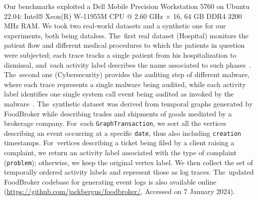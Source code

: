 \documentclass[information,article,accept,pdftex,oneauthor]{Definitions/mdpi}
\begin{document}
Our benchmarks exploited a Dell Mobile Precision Workstation 5760 on Ubuntu 22.04: Intel® Xeon(R) W-11955M CPU @ 2.60 GHz $\times$ 16, 64 GB DDR4 3200 MHz RAM. We took two real-world datasets and a synthetic one for our experiments, both being dataless. The~first real dataset ({Hospital}) monitors the patient flow and different medical procedures to which the patients in question were subjected; each trace tracks a single patient from his hospitalization to dismissal, and~each activity label describes the name associated to such phases~\cite{https://doi.org/10.4121/uuid:d9769f3d-0ab0-4fb8-803b-0d1120ffcf54}. The~second one ({Cybersecurity}) provides the auditing step of different malware, where each trace represents  a single malware being audited, while each activity label identifies one single system call event being audited as invoked by the malware~\cite{10.7717/peerj-cs.346,DBLP:conf/siu/YaziCG19}.  The~synthetic dataset was derived from temporal graphs generated by {FoodBroker} \cite{DBLP:conf/wbdb/PetermannJMR14} while describing trades and shipments of goods  mediated by a brokerage company. For~each \texttt{GraphTransaction}, we sort all the vertices describing an event occurring at a specific \texttt{date}, thus also including  \texttt{creation} timestamps. For~vertices describing a ticket being filed by a client raising a complaint, we return an activity label associated with the type of complaint (\texttt{problem}); otherwise, we keep the original vertex label. We then collect the set of temporally ordered activity labels and represent those as log traces. The~updated FoodBroker codebase for generating event logs is also available online (\url{https://github.com/jackbergus/foodbroker/}, Accessed on 7 January 2024).
\end{document}
